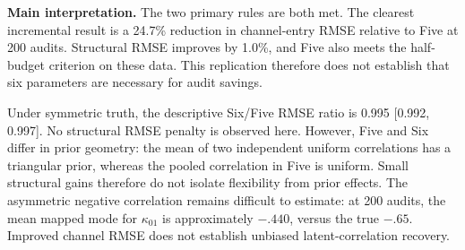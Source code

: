 \textbf{Main interpretation.} The two primary rules are both met. The clearest incremental result is a 24.7\% reduction in channel-entry RMSE relative to Five at 200 audits. Structural RMSE improves by 1.0\%, and Five also meets the half-budget criterion on these data. This replication therefore does not establish that six parameters are necessary for audit savings.

Under symmetric truth, the descriptive Six/Five RMSE ratio is 0.995 [0.992, 0.997]. No structural RMSE penalty is observed here. However, Five and Six differ in prior geometry: the mean of two independent uniform correlations has a triangular prior, whereas the pooled correlation in Five is uniform. Small structural gains therefore do not isolate flexibility from prior effects. The asymmetric negative correlation remains difficult to estimate: at 200 audits, the mean mapped mode for $\kappa_{01}$ is approximately $-.440$, versus the true $-.65$. Improved channel RMSE does not establish unbiased latent-correlation recovery.
